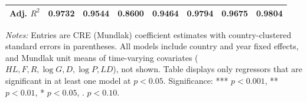 \begin{table}[!htbp]
\begin{tabular}{lccccccc}
Adj. $R^2$ & 0.9732 & 0.9544 & 0.8600 & 0.9464 & 0.9794 & 0.9675 & 0.9804 \\
\hline
\end{tabular}
\vspace{0.4em}
\begin{minipage}{0.96\linewidth}
\footnotesize
\textit{Notes:} Entries are CRE (Mundlak) coefficient estimates with country-clustered standard errors in parentheses.
All models include country and year fixed effects, and Mundlak unit means of time-varying covariates
($HL, F, R, \log G, D, \log P, LD$), not shown. Table displays only regressors that are significant in at least one model at $p<0.05$.
Significance: *** $p<0.001$, ** $p<0.01$, * $p<0.05$, . $p<0.10$.
\end{minipage}
\end{table}
